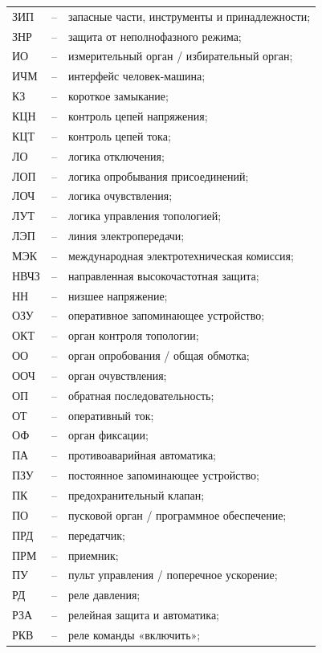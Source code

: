 \begin{longtable}{>{\raggedright\arraybackslash}m{2cm}>{\raggedright\arraybackslash}m{0.5cm}>{\raggedright\arraybackslash}m{20cm}}
ЗИП & -- & запасные части, инструменты и принадлежности; \\
ЗНР & -- & защита от неполнофазного режима; \\
ИО & -- & измерительный орган / избирательный орган; \\
ИЧМ & -- & интерфейс человек-машина; \\
КЗ & -- & короткое замыкание; \\
КЦН & -- & контроль цепей напряжения; \\
КЦТ & -- & контроль цепей тока; \\
ЛО & -- & логика отключения; \\
ЛОП & -- & логика опробывания присоединений; \\
ЛОЧ & -- & логика очувствления; \\
ЛУТ & -- & логика управления топологией; \\
ЛЭП & -- & линия электропередачи; \\
МЭК & -- & международная электротехническая комиссия; \\
НВЧЗ & -- & направленная высокочастотная защита; \\
НН & -- & низшее напряжение; \\
ОЗУ & -- & оперативное запоминающее устройство; \\
ОКТ & -- & орган контроля топологии; \\
ОО & -- & орган опробования / общая обмотка; \\
ООЧ & -- & орган очувствления; \\
ОП & -- & обратная последовательность; \\
ОТ & -- & оперативный ток; \\
ОФ & -- & орган фиксации; \\
ПА & -- & противоаварийная автоматика; \\
ПЗУ & -- & постоянное запоминающее устройство; \\
ПК & -- & предохранительный клапан; \\
ПО & -- & пусковой орган / программное обеспечение; \\
ПРД & -- & передатчик; \\
ПРМ & -- & приемник; \\
ПУ & -- & пульт управления / поперечное ускорение; \\
РД & -- & реле давления; \\
РЗА & -- & релейная защита и автоматика; \\
РКВ & -- & реле команды «включить»; \\

\end{longtable}

